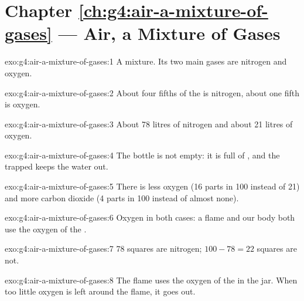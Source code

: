 \section*{Chapter \ref{ch:g4:air-a-mixture-of-gases} --- Air, a Mixture of Gases}

\begin{solution}{exo:g4:air-a-mixture-of-gases:1}
A mixture. Its two main gases are nitrogen and oxygen.
\end{solution}

\begin{solution}{exo:g4:air-a-mixture-of-gases:2}
About four fifths of the  is nitrogen, about one fifth is oxygen.
\end{solution}

\begin{solution}{exo:g4:air-a-mixture-of-gases:3}
About 78 litres of nitrogen and about 21 litres of oxygen.
\end{solution}

\begin{solution}{exo:g4:air-a-mixture-of-gases:4}
The bottle is not empty: it is full of , and the trapped  keeps
the water out.
\end{solution}

\begin{solution}{exo:g4:air-a-mixture-of-gases:5}
There is less oxygen (16 parts in 100 instead of 21) and more carbon
dioxide (4 parts in 100 instead of almost none).
\end{solution}

\begin{solution}{exo:g4:air-a-mixture-of-gases:6}
Oxygen in both cases: a flame and our body both use the oxygen of the
.
\end{solution}

\begin{solution}{exo:g4:air-a-mixture-of-gases:7}
78 squares are nitrogen; $100 - 78 = 22$ squares are not.
\end{solution}

\begin{solution}{exo:g4:air-a-mixture-of-gases:8}
The flame uses the oxygen of the  in the jar. When too little oxygen
is left around the flame, it goes out.
\end{solution}

